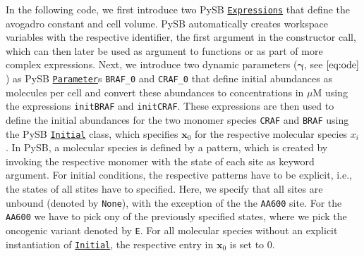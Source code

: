 \documentclass[11pt]{article}
\begin{document}
In the following code, we first introduce two PySB
\href{https://pysb.readthedocs.io/en/stable/modules/core.html\#pysb.core.Expression}{\texttt{Expressions}}
that define the avogadro constant and cell volume. PySB automatically
creates workspace variables with the respective identifier, the first
argument in the constructor call, which can then later be used as
argument to functions or as part of more complex expressions. Next, we
introduce two dynamic parameters (\(\boldsymbol{\gamma}\), see
\(\eqref{eq:ode}\)) as PySB
\href{https://pysb.readthedocs.io/en/stable/modules/core.html\#pysb.core.Parameter}{\texttt{Parameter}}s
\texttt{BRAF\_0} and \texttt{CRAF\_0} that define initial abundances as
molecules per cell and convert these abundances to concentrations in
\(\mu\mathrm{M}\) using the expressions \texttt{initBRAF} and
\texttt{initCRAF}. These expressions are then used to define the initial
abundances for the two monomer species \texttt{CRAF} and \texttt{BRAF}
using the PySB
\href{https://pysb.readthedocs.io/en/stable/modules/core.html\#pysb.core.Initial}{\texttt{Initial}}
class, which specifies \(\textbf{x}_0\) for the respective molecular
species \(x_i\). In PySB, a molecular species is defined by a pattern,
which is created by invoking the respective monomer with the state of
each site as keyword argument. For initial conditions, the respective
patterns have to be explicit, i.e., the states of all stites have to
specified. Here, we specify that all sites are unbound (denoted by
\texttt{None}), with the exception of the the \texttt{AA600} site. For
the \texttt{AA600} we have to pick ony of the previously specified
states, where we pick the oncogenic variant denoted by \texttt{E}. For
all molecular species without an explicit instantiation of
\href{https://pysb.readthedocs.io/en/stable/modules/core.html\#pysb.core.Initial}{\texttt{Initial}},
the respective entry in \(\textbf{x}_0\) is set to \(0\).
\end{document}
